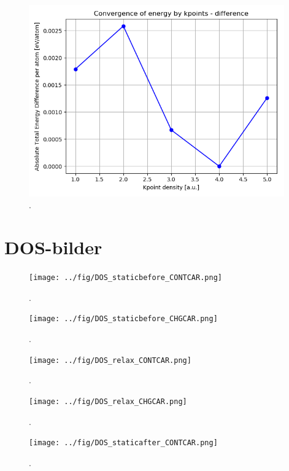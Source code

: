 \documentclass{article}
\begin{document}
  \begin{figure}[H]
      \centering
      \includegraphics[width = 11cm]{../fig/convergence_kpoints_difference.png}
      \caption{. }
      \label{fig:convergence_kpoints_difference.png}
  \end{figure}

\vspace{1cm}

\section{DOS-bilder}


  \iffalse
  \begin{figure}[H]
      \centering
      \texttt{[image: ../fig/DOS\_staticbefore\_CONTCAR.png]}
      \caption{. }
      \label{fig:DOS_staticbefore_CONTCAR}
  \end{figure}

  \begin{figure}[H]
      \centering
      \texttt{[image: ../fig/DOS\_staticbefore\_CHGCAR.png]}
      \caption{. }
      \label{fig:DOS_staticbefore_CHGCAR}
  \end{figure}

  \begin{figure}[H]
      \centering
      \texttt{[image: ../fig/DOS\_relax\_CONTCAR.png]}
      \caption{. }
      \label{fig:DOS_relax_CONTCAR}
  \end{figure}

  \begin{figure}[H]
      \centering
      \texttt{[image: ../fig/DOS\_relax\_CHGCAR.png]}
      \caption{. }
      \label{fig:DOS_relax_CHGCAR}
  \end{figure}

  \begin{figure}[H]
      \centering
      \texttt{[image: ../fig/DOS\_staticafter\_CONTCAR.png]}
      \caption{. }
      \label{fig:DOS_staticafter_CONTCAR}
  \end{figure}
\end{document}
